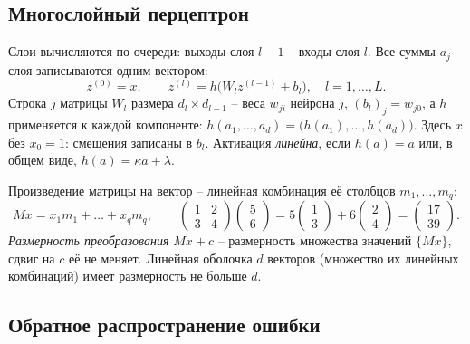 \documentclass[12pt,a4paper]{article}
\begin{document}
\subsection{Многослойный перцептрон}

Слои вычисляются по очереди: выходы слоя $l - 1$ -- входы слоя $l$. Все суммы
$a_j$ слоя записываются одним вектором:
\[
  z^{(0)} = x,
  \qquad
  z^{(l)} = h\bigl(W_l z^{(l-1)} + b_l\bigr), \quad l = 1, \dots, L .
\]
Строка $j$ матрицы $W_l$ размера $d_l \times d_{l-1}$ -- веса $w_{ji}$ нейрона $j$,
$(b_l)_j = w_{j0}$, а $h$ применяется к каждой компоненте:
$h(a_1, \dots, a_d) = \bigl(h(a_1), \dots, h(a_d)\bigr)$. Здесь $x$ без $x_0 = 1$:
смещения записаны в $b_l$. Активация \emph{линейна}, если $h(a) = a$ или, в общем
виде, $h(a) = \kappa a + \lambda$.

Произведение матрицы на вектор -- линейная комбинация её столбцов
$m_1, \dots, m_q$:
\[
  Mx = x_1m_1 + \dots + x_qm_q,
  \qquad
  \begin{pmatrix} 1 & 2\\ 3 & 4 \end{pmatrix}
  \begin{pmatrix} 5\\ 6 \end{pmatrix}
  = 5\begin{pmatrix} 1\\ 3 \end{pmatrix} + 6\begin{pmatrix} 2\\ 4 \end{pmatrix}
  = \begin{pmatrix} 17\\ 39 \end{pmatrix} .
\]
\emph{Размерность преобразования} $Mx + c$ -- размерность множества значений
$\{Mx\}$, сдвиг на $c$ её не меняет. Линейная оболочка $d$ векторов (множество их
линейных комбинаций) имеет размерность не больше $d$.

\subsection{Обратное распространение ошибки}
\end{document}

